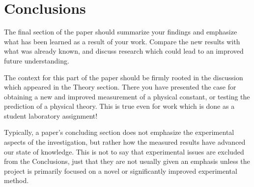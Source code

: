 \section{Conclusions}\label{sec:conclusion}

The final section of the paper should summarize your findings and emphasize what has been learned as a result of your work. Compare the new results with what was already known, and discuss research which could lead to an improved future understanding.

The context for this part of the paper should be firmly rooted in the discussion which appeared in the Theory section. There you have presented the case for obtaining a new and improved measurement of a physical constant, or testing the prediction of a physical theory. This is true even for work which is done as a student laboratory assignment!

Typically, a paper's concluding section does not emphasize the experimental aspects of the investigation, but rather how the measured results have advanced our state of knowledge. This is not to say that experimental issues are excluded from the Conclusions, just that they are not usually given an emphasis unless the project is primarily focused on a novel or significantly improved experimental method.